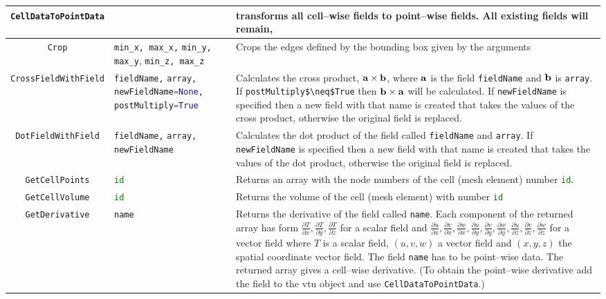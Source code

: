 \begin{landscape}
\begin{longtable}{|c | p{} |p{}|}
%
\lstinline[language=Python]+CellDataToPointData+ & & transforms all cell--wise fields to point--wise fields. All existing fields will remain, \\ \hline
\lstinline[language=Python]+Crop+ & \lstinline[language=Python]+min_x, max_x,+ \lstinline[language=Python]+min_y, max_y+, \lstinline[language=Python]+min_z, max_z+ & Crops the edges defined by the bounding box given by the arguments \\ \hline
%
\lstinline[language=Python]+CrossFieldWithField+ &  \lstinline[language=Python]+fieldName,+ \lstinline[language=Python]+array,+ \lstinline[language=Python]+newFieldName=None,+ \lstinline[language=Python]+postMultiply=True+ & Calculates the cross product, ${\bf a} \times {\bf b}$, where ${\bf a}$ is the field \lstinline[language=Python]+fieldName+ and ${\bf b}$ is \lstinline[language=Python]+array+. If \lstinline[language=Python]+postMultiply$\neq$True+ then ${\bf b} \times {\bf a}$ will be calculated. If \lstinline[language=Python]+newFieldName+ is specified  then a new field with that name is created that takes the values of the cross product, otherwise the original field is replaced. \\ \hline  
%
\lstinline[language=Python]+DotFieldWithField+ & \lstinline[language=Python]+fieldName,+ \lstinline[language=Python]+array,+ \lstinline[language=Python]+newFieldName+ & Calculates the dot product of the field called \lstinline[language=Python]+fieldName+ and \lstinline[language=Python]+array+. If \lstinline[language=Python]+newFieldName+ is specified then a new field with that name is created that takes the values of the dot product, otherwise the original field is replaced. \\ \hline
%
\lstinline[language=Python]+GetCellPoints+ & \lstinline[language=Python]+id+ & Returns an array with the node numbers of the cell (mesh element) number \lstinline[language=Python]+id+. \\ \hline
%
\lstinline[language=Python]+GetCellVolume+ & \lstinline[language=Python]+id+ & Returns the volume of the cell (mesh element) with number \lstinline[language=Python]+id+ \\ \hline
%
\lstinline[language=Python]+GetDerivative+ & \lstinline[language=Python]+name+ & Returns the derivative of the field called \lstinline[language=Python]+name+. Each component of the returned array has form $ \frac{\partial T}{\partial x}, \frac{\partial T}{\partial y}, \frac{\partial T}{\partial z}$ for a scalar field and $\frac{\partial u}{\partial x}, \frac{\partial v}{\partial x}, \frac{\partial w}{\partial x}, \frac{\partial u}{\partial y}, \frac{\partial v}{\partial y}, \frac{\partial w}{\partial y}, \frac{\partial u}{\partial z}, \frac{\partial v}{\partial z}, \frac{\partial w}{\partial z}$ for a vector field where $T$ is a scalar field, $(u,v,w)$ a vector field and $(x,y,z)$ the spatial coordinate vector field. The field \lstinline[language=Python]+name+ has to be point--wise data. The returned array gives a cell--wise derivative. (To obtain the point--wise derivative add the field to the vtu object and use \lstinline[language=Python]+CellDataToPointData+.)  \\ \hline

\end{longtable}
\end{landscape}
